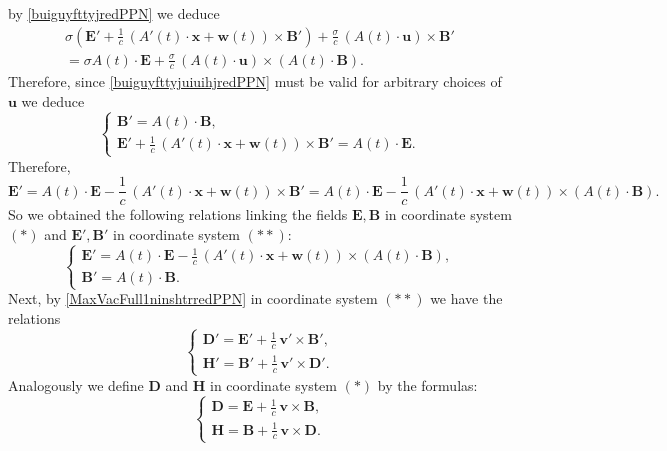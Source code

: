 \documentclass{article}
\theoremstyle{definition}
\theoremstyle{remark}
\renewcommand{\vec}[1]{\mathbf{#1}}
\newcommand{\R}{\mathbb{R}}
\newcommand{\er}{\eqref}
\newcommand{\R}{{\mathbb{R}}}
\newcommand{\er}{\eqref}
\begin{document}
by \er{buiguyfttyjredPPN} we deduce
\begin{multline}\label{buiguyfttyjuiuihjredPPN}
\sigma \left(\vec E'+\frac{1}{c}\,\left(A'(t)\cdot\vec x+\vec
w(t)\right)\times \vec B'\right)+\frac{\sigma}{c}\,\left(A(t)\cdot
\vec u\right)\times \vec B'\\=\sigma A(t)\cdot\vec
E+\frac{\sigma}{c}\,\left(A(t)\cdot\vec u\right)\times
\left(A(t)\cdot\vec B\right).
\end{multline}
Therefore, since \er{buiguyfttyjuiuihjredPPN} must be valid for
arbitrary choices of $\vec u$ we deduce
\begin{equation*}
\begin{cases}
\vec B'=A(t)\cdot\vec B,
\\
\vec E'+\frac{1}{c}\,\left(A'(t)\cdot\vec x+\vec w(t)\right)\times
\vec B'=A(t)\cdot\vec E.
\end{cases}
\end{equation*}
Therefore,
\begin{equation*}
\vec E'=A(t)\cdot\vec E-\frac{1}{c}\,\left(A'(t)\cdot\vec x+\vec
w(t)\right)\times \vec B'=A(t)\cdot\vec
E-\frac{1}{c}\,\left(A'(t)\cdot\vec x+\vec w(t)\right)\times
\left(A(t)\cdot\vec B\right).
\end{equation*}
So we obtained the following relations linking the fields $\vec
E,\vec B$ in coordinate system $(*)$ and $\vec E',\vec B'$ in
coordinate system $(**)$:
\begin{equation}\label{yuythfgfyftydtydtydtyddredPPN}
\begin{cases}
\vec E'=A(t)\cdot\vec E-\frac{1}{c}\,\left(A'(t)\cdot\vec x+\vec
w(t)\right)\times \left(A(t)\cdot\vec B\right),
\\
\vec B'=A(t)\cdot\vec B.
\end{cases}
\end{equation}
Next, by \er{MaxVacFull1ninshtrredPPN} in coordinate system $(**)$
we have the relations
\begin{equation*}
\begin{cases}
\vec D'=\vec E'+\frac{1}{c}\,\vec v'\times \vec B',\\
\vec H'=\vec B'+\frac{1}{c}\,\vec v'\times \vec D'.
\end{cases}
\end{equation*}
Analogously we define $\vec D$ and $\vec H$  in coordinate system
$(*)$ by the formulas:
\begin{equation}\label{gjhghfhgdghdredPPN}
\begin{cases}
\vec D=\vec E+\frac{1}{c}\,\vec v\times \vec B,\\
\vec H=\vec B+\frac{1}{c}\,\vec v\times \vec D.
\end{cases}
\end{equation}
\end{document}
